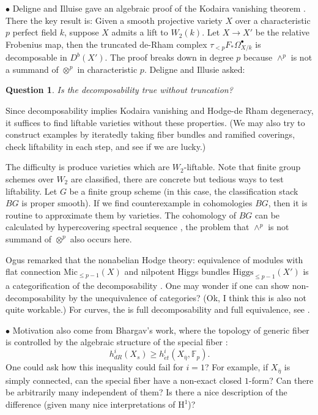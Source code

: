 \documentclass[8pt]{amsart}
\newtheorem{question}[theorem]{Question}
\begin{document}
$\bullet$ Deligne and Illuise gave an algebraic proof of the Kodaira vanishing theorem \cite{DI}. There the key result is: Given a smooth projective variety $X$ over a characteristic $p$ perfect field $k$, suppose $X$ admits a lift to $W_2(k)$. Let $X\to X'$ be the relative Frobenius map, then the truncated de-Rham complex $\tau_{<p}F_*\Omega^\bullet_{X/k}$ is decomposable in $D^b(X')$. The proof breaks down in degree $p$ because $\wedge^p$ is not a summand of $\otimes^p$ in characteristic $p$. Deligne and Illusie asked:
\begin{question}Is the decomposability true without truncation?
\end{question}
Since decomposability implies Kodaira vanishing and Hodge-de Rham degeneracy, it suffices to find liftable varieties without these properties. (We may also try to construct examples by iteratedly taking fiber bundles and ramified coverings, check liftability in each step, and see if we are lucky.)

The difficulty is produce varieties which are $W_2$-liftable.
Note that finite group schemes over $W_2$ are classified, there are concrete but tedious ways to test liftability. Let $G$ be a finite group scheme (in this case, the classification stack $BG$ is proper smooth).
If we find counterexample in cohomologies $BG$, then it is routine to approximate them by varieties. The cohomology of $BG$ can be calculated by hypercovering spectral sequence \cite{Tot}, the problem that $\wedge^p$ is not summand of $\otimes^p$ also occurs here.

Ogus remarked that the nonabelian Hodge theory: equivalence of modules with flat connection $\mathrm{Mic}_{\leq p-1}(X)$ and nilpotent Higgs bundles $\mathrm{Higgs}_{\leq p-1}(X')$ is a categorification of the decomposability \cite{Volo}. One may wonder if one can show non-decomposability by the unequivalence of categories? (Ok, I think this is also not quite workable.) For curves, the is full decomposability and full equivalence, see \cite{Xin}.

$\bullet$ Motivation also come from Bhargav's work, where the topology of generic fiber is controlled by the algebraic structure of the special fiber \cite{BMS}: $$h^i_{dR}(X_s)\geq h^i_{\acute{e}t}(X_{\overline{\eta}},\mathbb{F}_p).$$
One could ask how this inequality could fail for $i=1$? For example, if $X_{\overline{\eta}}$ is simply connected, can the special fiber have a non-exact closed $1$-form? Can there be arbitrarily many independent of them? Is there a nice description of the difference (given many nice interpretations of $\mathrm{H}^1$)?
\end{document}
